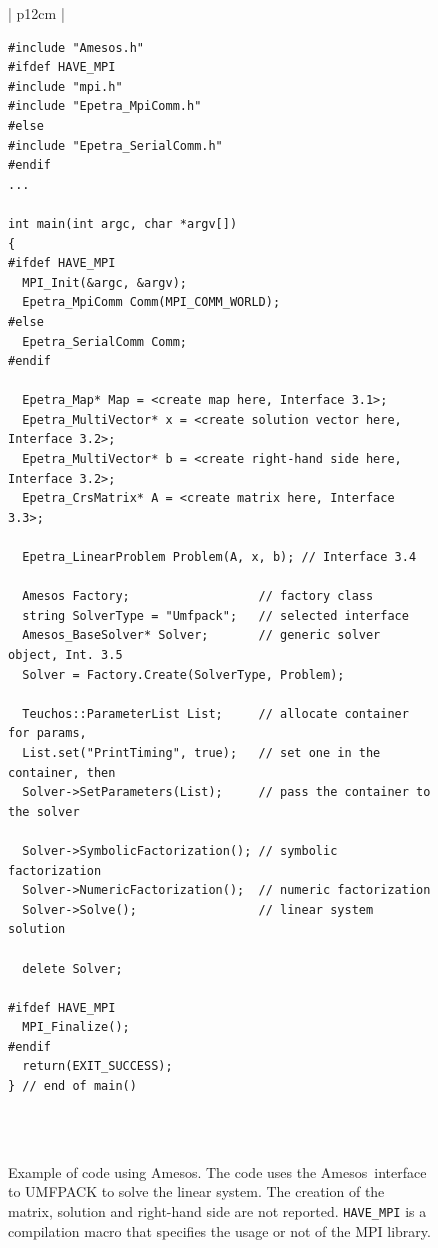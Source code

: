 \documentclass[acmtocl]{acmtrans2m}
\newcommand{\amesos}{{\sc Amesos}}
\begin{document}
\begin{figure}
\begin{center}
\begin{tabular}{| p{12cm} | }
\hline
 \\
\begin{minipage}{12cm}
\begin{verbatim}
#include "Amesos.h"
#ifdef HAVE_MPI
#include "mpi.h"
#include "Epetra_MpiComm.h"
#else
#include "Epetra_SerialComm.h"
#endif
...

int main(int argc, char *argv[]) 
{
#ifdef HAVE_MPI
  MPI_Init(&argc, &argv);
  Epetra_MpiComm Comm(MPI_COMM_WORLD);
#else
  Epetra_SerialComm Comm;
#endif

  Epetra_Map* Map = <create map here, Interface 3.1>;
  Epetra_MultiVector* x = <create solution vector here, Interface 3.2>;
  Epetra_MultiVector* b = <create right-hand side here, Interface 3.2>; 
  Epetra_CrsMatrix* A = <create matrix here, Interface 3.3>;

  Epetra_LinearProblem Problem(A, x, b); // Interface 3.4

  Amesos Factory;                  // factory class
  string SolverType = "Umfpack";   // selected interface
  Amesos_BaseSolver* Solver;       // generic solver object, Int. 3.5
  Solver = Factory.Create(SolverType, Problem);

  Teuchos::ParameterList List;     // allocate container for params,
  List.set("PrintTiming", true);   // set one in the container, then
  Solver->SetParameters(List);     // pass the container to the solver

  Solver->SymbolicFactorization(); // symbolic factorization
  Solver->NumericFactorization();  // numeric factorization
  Solver->Solve();                 // linear system solution

  delete Solver;
    
#ifdef HAVE_MPI
  MPI_Finalize();
#endif
  return(EXIT_SUCCESS);
} // end of main()
\end{verbatim}
\end{minipage} \\
 \\
 \hline
\end{tabular}
\caption{Example of code using \amesos. The code uses the \amesos\ interface to
  UMFPACK to solve the linear system. The creation of the matrix, solution and
    right-hand side are not reported. {\tt HAVE\_MPI} is a compilation macro
    that specifies the usage or not of the MPI library.}
\label{fig:example}
\end{center}
\end{figure}
\end{document}
